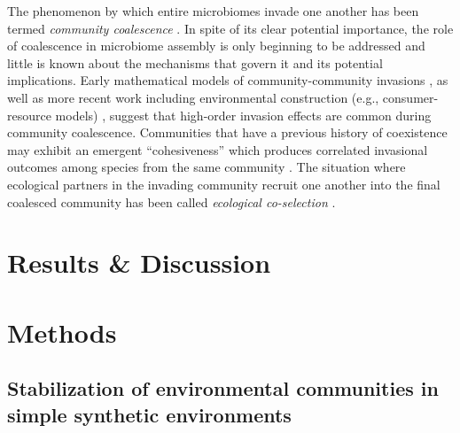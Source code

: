 \documentclass[a4paper,10pt]{article}
\begin{document}
The phenomenon by which entire microbiomes invade one another has been termed
\textit{community coalescence} \cite{Rillig2015}.
In spite of its clear potential importance, the role of coalescence in microbiome assembly is
only beginning to be addressed and little is known about the mechanisms that govern it and its
potential implications.
Early mathematical models of community-community invasions \cite{Gilpin1994,Toquenaga1997},
as well as more recent work including environmental construction (e.g., consumer-resource models)
\cite{Tikhonov2016,Tikhonov2017,Lechon2021}, suggest that high-order invasion effects are common
during community coalescence. Communities that have a previous history of coexistence may exhibit an
emergent ``cohesiveness'' which produces correlated invasional outcomes among species from the
same community \cite{Livingston2013,Sierocinski2017}.
The situation where ecological partners in the invading community recruit one another into the final
coalesced community has been called \textit{ecological co-selection} \cite{Rillig2017,Sierocinski2017}.

\section*{Results \& Discussion}\label{results-discussion}

\clearpage

\section*{Methods}\label{methods}

\subsection*{Stabilization of environmental communities in simple synthetic environments}
\label{methods:community-assembly}
\end{document}
